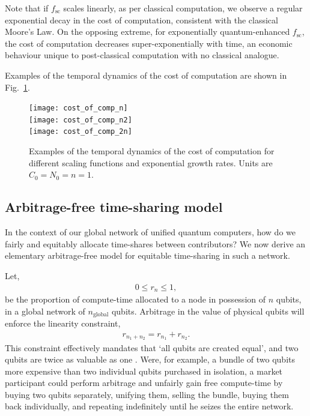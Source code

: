 Note that if $f_\text{sc}$ scales linearly, as per classical computation, we observe a regular exponential decay in the cost of computation, consistent with the classical Moore's Law. On the opposing extreme, for exponentially quantum-enhanced $f_\text{sc}$, the cost of computation decreases super-exponentially with time, an economic behaviour unique to post-classical computation with no classical analogue.

Examples of the temporal dynamics of the cost of computation are shown in Fig.~\ref{fig:econ_cost_of_comp}.

\begin{figure}[!htb]
\texttt{[image: cost\_of\_comp\_n]} \\
\texttt{[image: cost\_of\_comp\_n2]} \\
\texttt{[image: cost\_of\_comp\_2n]}
\caption{Examples of the temporal dynamics of the cost of computation for different scaling functions and exponential growth rates. Units are \mbox{$C_0=N_0=n=1$}.}\label{fig:econ_cost_of_comp}
\end{figure}

%
%

\subsection{Arbitrage-free time-sharing model}\label{sec:arb_free_time_share} 

In the context of our global network of unified quantum computers, how do we fairly and equitably allocate time-shares between contributors? We now derive an elementary arbitrage-free model for equitable time-sharing in such a network.

Let,
\begin{align}
	0\leq r_n \leq 1,
\end{align}
be the proportion of compute-time allocated to a node in possession of $n$ qubits, in a global network of $n_\text{global}$ qubits. Arbitrage in the value of physical qubits will enforce the linearity constraint,
\begin{align}
	r_{n_1+n_2} = r_{n_1} + r_{n_2}.
\end{align}
This constraint effectively mandates that `all qubits are created equal', and two qubits are twice as valuable as one . Were, for example, a bundle of two qubits more expensive than two individual qubits purchased in isolation, a market participant could perform arbitrage and unfairly gain free compute-time by buying two qubits separately, unifying them, selling the bundle, buying them back individually, and repeating indefinitely until he seizes the entire network.

